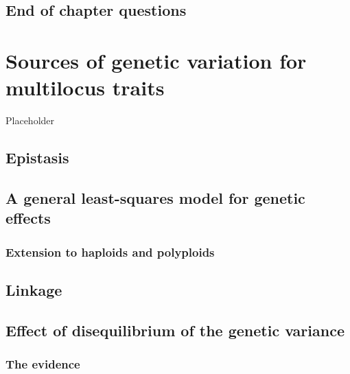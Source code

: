 \documentclass[
]{book}
\begin{document}
\hypertarget{end-of-chapter-questions-1}{%
\section{End of chapter questions}\label{end-of-chapter-questions-1}}

\hypertarget{sources-of-genetic-variation-for-multilocus-traits}{%
\chapter{Sources of genetic variation for multilocus traits}\label{sources-of-genetic-variation-for-multilocus-traits}}

Placeholder

\hypertarget{epistasis}{%
\section{Epistasis}\label{epistasis}}

\hypertarget{a-general-least-squares-model-for-genetic-effects}{%
\section{A general least-squares model for genetic effects}\label{a-general-least-squares-model-for-genetic-effects}}

\hypertarget{extension-to-haploids-and-polyploids}{%
\subsection{Extension to haploids and polyploids}\label{extension-to-haploids-and-polyploids}}

\hypertarget{linkage}{%
\section{Linkage}\label{linkage}}

\hypertarget{effect-of-disequilibrium-of-the-genetic-variance}{%
\section{Effect of disequilibrium of the genetic variance}\label{effect-of-disequilibrium-of-the-genetic-variance}}

\hypertarget{the-evidence}{%
\subsection{The evidence}\label{the-evidence}}
\end{document}
